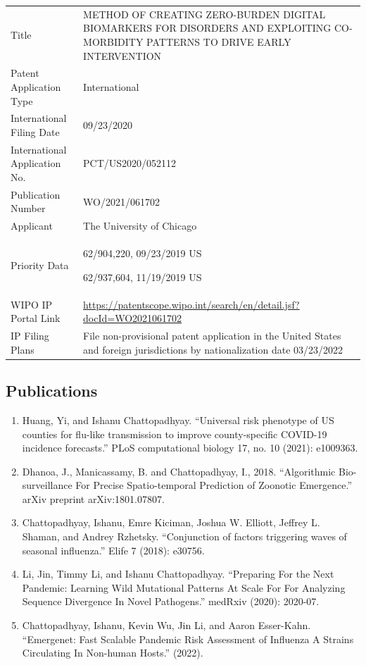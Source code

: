 \documentclass[onecolumn, compsoc,12pt]{IEEEtran}
\begin{document}
\begin{table}[!ht]
  \label{tabpatent}
  \begin{tabular}{R{1.5in}L{5in}}
Title&  METHOD OF CREATING ZERO-BURDEN DIGITAL BIOMARKERS FOR DISORDERS AND EXPLOITING CO-MORBIDITY PATTERNS TO DRIVE EARLY INTERVENTION \\
Patent Application Type & International\\
International Filing Date & 09/23/2020 \\
International Application No.& PCT/US2020/052112 \\
Publication Number &  WO/2021/061702 \\
Applicant & The University of Chicago\\
Priority Data &  62/904,220, 09/23/2019 US

                            62/937,604, 11/19/2019 US \\
    WIPO IP Portal Link & \url{https://patentscope.wipo.int/search/en/detail.jsf?docId=WO2021061702}\\
IP Filing Plans & File non-provisional patent application in the United States and foreign jurisdictions by nationalization date 03/23/2022\\\hline
  \end{tabular}
  \end{table}


\subsection*{Publications}

\begin{enumerate} 
[label=$\square$, leftmargin=0pt,
labelindent=0em, topsep=0.1em, labelsep=*, itemsep=.5em,itemindent=1em]
\item Huang, Yi, and Ishanu Chattopadhyay. ``Universal risk phenotype of US counties for flu-like transmission to improve county-specific COVID-19 incidence forecasts.'' PLoS computational biology 17, no. 10 (2021): e1009363.

\item Dhanoa, J., Manicassamy, B. and Chattopadhyay, I., 2018. ``Algorithmic Bio-surveillance For Precise Spatio-temporal Prediction of Zoonotic Emergence.'' arXiv preprint arXiv:1801.07807.

\item Chattopadhyay, Ishanu, Emre Kiciman, Joshua W. Elliott, Jeffrey L. Shaman, and Andrey Rzhetsky. ``Conjunction of factors triggering waves of seasonal influenza.'' Elife 7 (2018): e30756.

\item Li, Jin, Timmy Li, and Ishanu Chattopadhyay. ``Preparing For the Next Pandemic: Learning Wild Mutational Patterns At Scale For For Analyzing Sequence Divergence In Novel Pathogens.'' medRxiv (2020): 2020-07.

  \item Chattopadhyay, Ishanu, Kevin Wu, Jin Li, and Aaron Esser-Kahn. ``Emergenet: Fast Scalable Pandemic Risk Assessment of Influenza A Strains Circulating In Non-human Hosts.'' (2022).

\end{enumerate}
\end{document}
